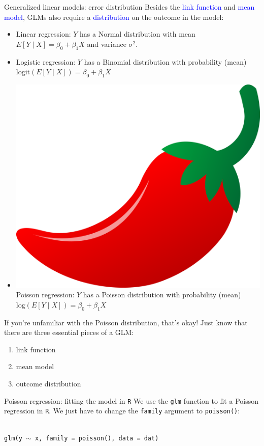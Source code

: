 \documentclass[10pt,t]{beamer}
\begin{document}
\begin{frame}{Generalized linear models: error distribution}
	Besides the \textcolor{blue}{link function} and \textcolor{blue}{mean model}, GLMs also require a \textcolor{blue}{distribution} on the outcome in the model:
	\begin{itemize}
		\item Linear regression: $Y$ has a Normal distribution with mean $E[Y \mid X] = \beta_0 + \beta_1X$ and variance $\sigma^2$.
		\item Logistic regression: $Y$ has a Binomial distribution with probability (mean) $\text{logit}(E[Y \mid X]) = \beta_0 + \beta_1X$
		\item \includegraphics[scale=0.01]{./figs/chilipepper} Poisson regression: $Y$ has a Poisson distribution with probability (mean) $\text{log}(E[Y \mid X]) = \beta_0 + \beta_1X$
	\end{itemize}
	If you're unfamiliar with the Poisson distribution, that's okay! Just know that there are three essential pieces of a GLM: 
	\begin{enumerate}
		\item link function 
		\item mean model
		\item outcome distribution
	\end{enumerate}
\end{frame}

\begin{frame}{Poisson regression: fitting the model in \texttt{R}}
	We use the \texttt{glm} function to fit a Poisson regression in \texttt{R}. We just have to change the \texttt{family} argument to \texttt{poisson()}:
	\\ ~\
	
	\texttt{glm(y $\sim$ x, family = poisson(), data = dat)}
\end{frame}
\end{document}
